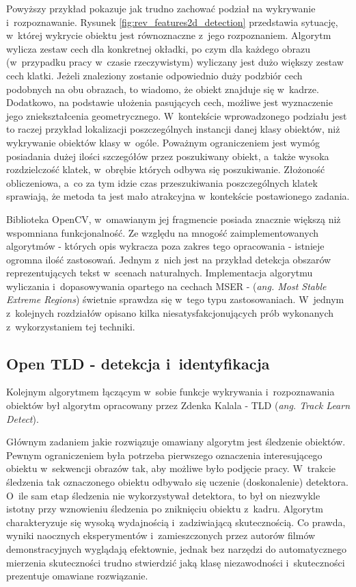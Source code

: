 Powyższy przykład pokazuje jak trudno zachować podział na wykrywanie
i~rozpoznawanie. Rysunek \ref{fig:rev_features2d_detection}
przedstawia sytuację, w~której wykrycie obiektu jest równoznaczne
z~jego rozpoznaniem.
Algorytm wylicza zestaw cech dla konkretnej okładki, po czym dla każdego
obrazu (w~przypadku pracy w~czasie rzeczywistym) wyliczany
jest dużo większy zestaw cech klatki. Jeżeli znaleziony zostanie
odpowiednio duży podzbiór cech podobnych na obu obrazach, to wiadomo,
że obiekt znajduje się w~kadrze.
Dodatkowo, na podstawie ułożenia pasujących cech, możliwe jest
wyznaczenie jego zniekształcenia geometrycznego. W~kontekście wprowadzonego
podziału jest to raczej przykład lokalizacji poszczególnych instancji danej
klasy obiektów, niż wykrywanie obiektów klasy w~ogóle.
Poważnym
ograniczeniem jest wymóg posiadania dużej ilości szczegółów przez 
poszukiwany
obiekt, a~także wysoka rozdzielczość klatek, w~obrębie których odbywa się
poszukiwanie. Złożoność obliczeniowa, a~co za tym idzie czas przeszukiwania
poszczególnych klatek sprawiają, że metoda ta jest mało atrakcyjna w~kontekście
postawionego zadania.

Biblioteka OpenCV, w~omawianym jej fragmencie posiada znacznie
większą niż wspomniana funkcjonalność.
Ze względu na mnogość zaimplementowanych algorytmów - których opis
wykracza poza zakres tego opracowania - istnieje ogromna ilość
zastosowań. Jednym z~nich jest na przykład
detekcja obszarów
reprezentujących tekst w~scenach naturalnych. Implementacja algorytmu 
wyliczania i~dopasowywania opartego na cechach MSER - (\textit{ang. Most
Stable Extreme Regions}) \cite{OCV:MSER} świetnie
sprawdza się w~tego typu zastosowaniach. W~jednym z~kolejnych
rozdziałów opisano kilka niesatysfakcjonujących prób
wykonanych z~wykorzystaniem tej techniki.

\subsection{Open TLD - detekcja i~identyfikacja}

Kolejnym algorytmem łączącym w~sobie funkcje wykrywania
i~rozpoznawania obiektów był algorytm opracowany przez
Zdenka Kalala \cite{DBLP:journals/pami/KalalMM12} - TLD (\textit{ang.
Track Learn Detect}).

Głównym zadaniem jakie rozwiązuje omawiany algorytm jest śledzenie obiektów.
Pewnym ograniczeniem była potrzeba pierwszego oznaczenia interesującego
obiektu w~sekwencji obrazów tak, aby możliwe było podjęcie pracy.
W~trakcie śledzenia tak oznaczonego obiektu odbywało się uczenie (doskonalenie)
detektora. O~ile sam etap śledzenia nie wykorzystywał detektora, to był on
niezwykle istotny przy wznowieniu śledzenia po zniknięciu obiektu z~kadru.
Algorytm charakteryzuje się wysoką wydajnością i~zadziwiającą skutecznością.
Co prawda, wyniki naocznych eksperymentów i~zamieszczonych przez autorów filmów
demonstracyjnych wyglądają efektownie, jednak bez narzędzi do automatycznego
mierzenia skuteczności trudno stwierdzić jaką klasę niezawodności 
i~skuteczności prezentuje omawiane rozwiązanie.


